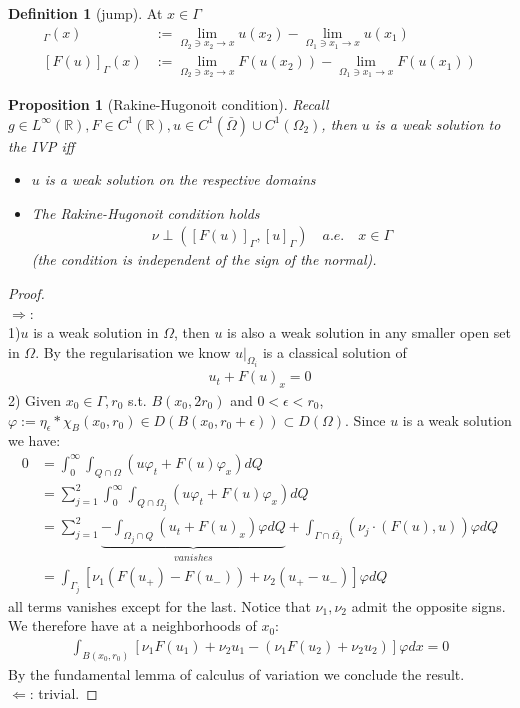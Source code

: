 \documentclass[a4paper,11pt,oneside,fleqn]{book}
\newtheorem{proposition}[theorem]{Proposition}
\theoremstyle{definition}
\newtheorem{definition}{Definition}[section]
\theoremstyle{remark}
\begin{document}
\begin{definition}[jump]
	At $x \in \Gamma$ 
	\begin{align*}
		[u]_\Gamma(x)&:= \lim_{\Omega_2 \ni x_2 \rightarrow x} u(x_2) - \lim_{\Omega_1 \ni x_1 \rightarrow x} u(x_1)\\
		[F(u)]_\Gamma(x) &:= \lim_{\Omega_2 \ni x_2 \rightarrow x}F(u(x_2)) - \lim_{\Omega_1 \ni x_1 \rightarrow x} F(u(x_1))
	\end{align*}
\end{definition}

\begin{proposition}[Rakine-Hugonoit condition]
	Recall $g \in L^\infty(\mathbb{R}), F \in C^1(\mathbb{R}), u \in C^1(\bar{\Omega})\cup C^1(\Omega_2)$, then $u$ is a weak solution to the IVP iff
	\begin{itemize}
		\item $u$ is a weak solution on the respective domains
		\item The Rakine-Hugonoit condition holds
		\begin{align*}
			\nu \perp ([F(u)]_\Gamma, [u]_\Gamma) \quad a.e. \quad x \in \Gamma
		\end{align*}
		(the condition is independent of the sign of the normal). 
	\end{itemize}
\end{proposition}
\begin{proof}
	\quad\\
	$\Rightarrow$:\\
	1)$u$ is a weak solution in $\Omega$, then $u$ is also a weak solution in any smaller open set in $\Omega$. By the regularisation we know $u|_{\Omega_i}$ is a classical solution of 
	\begin{align*}
		u_t + F(u)_x = 0
	\end{align*}
	2) Given $x_0 \in \Gamma, r_0$ s.t. $B(x_0, 2 r_0)$ and $0 < \epsilon < r_0$, $\varphi:= \eta_\epsilon * \chi_B(x_0, r_0) \in D(B(x_0, r_0 + \epsilon)) \subset D(\Omega)$. Since $u$ is a weak solution we have:
	\begin{align*}
		0 &= \int_0^\infty \int_{Q \cap \Omega} (u \varphi_t + F(u) \varphi_x) dQ\\
		&=  \sum_{j = 1}^2 \int_0^\infty \int_{Q \cap \Omega_j} (u\varphi_t + F(u) \varphi_x) dQ  \\
		&=  \sum_{j = 1}^2 \underbrace{ - \int_{\Omega_j \cap Q}  (u_t + F(u)_x)\varphi dQ}_{vanishes} + 
		\int_{\Gamma \cap \overline{\Omega_j}} (\nu_j \cdot (F(u), u)) \varphi dQ\\
		& =  \int_{\Gamma_j } [\nu_1(F(u_+ ) - F(u_-))+ \nu_2(u_+ - u_-) ] \varphi dQ
	\end{align*}
	all terms vanishes except for the last. Notice that $\nu_1, \nu_2$ admit the opposite signs. We therefore have at a neighborhoods of $x_0$:
	\begin{align*}
		\int_{B(x_0, r_0)}[ \nu_1 F(u_1) + \nu_2u_1 - (\nu_1 F(u_2) + \nu_2 u_2)] \varphi dx = 0
	\end{align*}
	By the fundamental lemma of calculus of variation we conclude the result.
	\quad\\
	$\Leftarrow$: trivial.
\end{proof}
\end{document}
